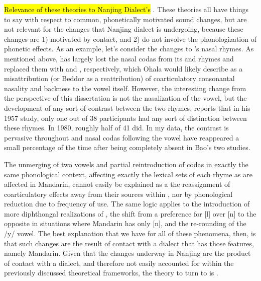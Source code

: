     \hl{Relevance of these theories to Nanjing Dialect's }\mdzn{}\hl{ }\IRL{}. These theories all have things to say with respect to common, phonetically motivated sound changes, but are not relevant for the changes that Nanjing dialect is undergoing, because these changes are 1) motivated by contact, and 2) do not involve the phonologization of phonetic effects. As an example, let's consider the changes to \ND{}'s nasal rhymes. As mentioned above, \ND{} has largely lost the nasal codas from its  and  rhymes and replaced them with \textipa{[\~{\ae}]} and \textipa{[\~{A}]}, respectively, which Ohala would likely describe as a misattribution (or Beddor as a reattribution) of coarticulatory consonantal nasality and backness to the vowel itself. However, the interesting change from the perspective of this dissertation is not the nasalization of the vowel, but the development of any sort of contrast between the two rhymes. \cite[orig. 1980]{bao1980sixty} reports that in his 1957 study, only one out of 38 participants had any sort of distinction between these rhymes. In 1980, roughly half of 41 did. In my data, the contrast is pervasive throughout \ND{} and nasal codas following the  vowel have reappeared a small percentage of the time after being completely absent in Bao's two studies.

    The unmerging of two vowels and partial reintroduction of codas in exactly the same phonological context, affecting exactly the lexical sets of each rhyme as are affected in Mandarin, cannot easily be explained as a the reassignment of coarticulatory effects away from their sources within \ND{}, nor by phonological reduction due to frequency of use. The same logic applies to the introduction of more diphthongal realizations of , the shift from a preference for [l] over [n] to the opposite in situations where Mandarin has only [n], and the re-rounding of the /y/ vowel. The best explanation that we have for all of these phenomena, then, is that such changes are the result of contact with a dialect that has those features, namely Mandarin. Given that the changes underway in Nanjing are the product of contact with a dialect, and therefore not easily accounted for within the previously discussed theoretical frameworks, the theory to turn to is \cbat{}.
    
